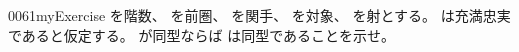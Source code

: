 \documentclass[index]{subfiles}
\begin{document}
\begin{myBlock}{0061}{myExercise}
  を階数、
  を前圏、
  を関手、
  を対象、
  を射とする。
  は充満忠実であると仮定する。
  が同型ならば
  は同型であることを示せ。
\end{myBlock}
\end{document}
